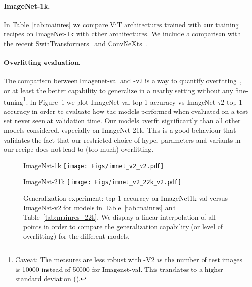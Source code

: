 \paragraph{\textbf{ImageNet-1k.}}

In Table~\ref{tab:mainres} we compare ViT architectures trained with our training recipes on ImageNet-1k with other architectures. We include a comparison with the recent SwinTransformers~\cite{liu2021swin} and ConvNeXts~\cite{Liu2022convnext}.



\paragraph{\textbf{Overfitting evaluation.}}

The comparison between Imagenet-val and -v2 is a way to quantify overfitting~\cite{Touvron2020FixingTT}, or at least the better capability to generalize in a nearby setting without any fine-tuning\footnote{Caveat: The measures are less robust with -V2 as the number of test images is 10000 instead of 50000 for Imagenet-val. This translates to a higher standard deviation ().}.   
In Figure~\ref{fig:imagenet_v2} we plot ImageNet-val top-1 accuracy  vs ImageNet-v2 top-1 accuracy in order to evaluate how the models performed when evaluated on a test set never seen at validation time. 
Our models overfit significantly than all other models considered, especially on ImageNet-21k. This is a good behaviour that validates the fact that our restricted choice of hyper-parameters and variants in our recipe does not lead to (too much) overfitting. 


\begin{figure}
\begin{minipage}{0.48 \linewidth}
    \centering
    ImageNet-1k
    \texttt{[image: Figs/imnet\_v2\_v2.pdf]}
    \end{minipage}
    \hfill
    \begin{minipage}{0.48 \linewidth}
    \centering
    ImageNet-21k
    \texttt{[image: Figs/imnet\_v2\_22k\_v2.pdf]}
    \end{minipage}
    \caption{Generalization experiment: top-1 accuracy on ImageNet1k-val versus ImageNet-v2 for models in Table~\ref{tab:mainres} and Table~\ref{tab:mainres_22k}. We display a linear interpolation of all points in order to compare the generalization capability (or level of overfitting) for the different models.
    \label{fig:imagenet_v2}}
\end{figure}


